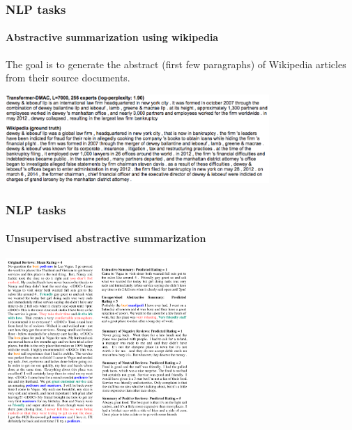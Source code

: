 \documentclass[9pt]{beamer}
\begin{document}
\begin{frame}
  \frametitle{NLP tasks}

  \framesubtitle{Abstractive summarization using wikipedia}

  The goal is to generate the abstract (first few paragraphs) of
  Wikipedia articles from their source documents.

  \bigskip

  \begin{center}
    \includegraphics[width = 10cm]{images/wikipedia_summarization.png}
  \end{center}
\end{frame}

\begin{frame}
  \frametitle{NLP tasks}

  \framesubtitle{Unsupervised abstractive summarization}

  \begin{center}
    \includegraphics[width = 7cm]{images/unsupervised_summarization.png}
  \end{center}
\end{frame}
\end{document}
